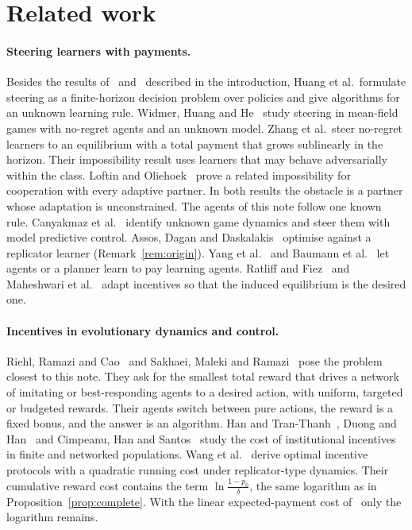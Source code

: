 \documentclass[11pt,a4paper]{article}
\theoremstyle{definition}
\theoremstyle{plain}
\begin{document}
\section{Related work}\label{sec:related}

\paragraph{Steering learners with payments.}
Besides the results of~\cite{huang2025} and~\cite{zhang2024} described in the introduction, Huang et al.\ formulate steering as a finite-horizon decision problem over policies and give algorithms for an unknown learning rule. Widmer, Huang and He~\cite{widmer2025} study steering in mean-field games with no-regret agents and an unknown model. Zhang et al.\ steer no-regret learners to an equilibrium with a total payment that grows sublinearly in the horizon. Their impossibility result uses learners that may behave adversarially within the class. Loftin and Oliehoek~\cite{loftin2022} prove a related impossibility for cooperation with every adaptive partner. In both results the obstacle is a partner whose adaptation is unconstrained. The agents of this note follow one known rule. Canyakmaz et al.~\cite{canyakmaz2025} identify unknown game dynamics and steer them with model predictive control. Assos, Dagan and Daskalakis~\cite{assos2024} optimise against a replicator learner (Remark~\ref{rem:origin}). Yang et al.~\cite{yang2020} and Baumann et al.~\cite{baumann2020} let agents or a planner learn to pay learning agents. Ratliff and Fiez~\cite{ratliff2018} and Maheshwari et al.~\cite{maheshwari2022} adapt incentives so that the induced equilibrium is the desired one.

\paragraph{Incentives in evolutionary dynamics and control.}
Riehl, Ramazi and Cao~\cite{riehl2017} and Sakhaei, Maleki and Ramazi~\cite{sakhaei2022} pose the problem closest to this note. They ask for the smallest total reward that drives a network of imitating or best-responding agents to a desired action, with uniform, targeted or budgeted rewards. Their agents switch between pure actions, the reward is a fixed bonus, and the answer is an algorithm. Han and Tran-Thanh~\cite{han2018}, Duong and Han~\cite{duong2021} and Cimpeanu, Han and Santos~\cite{cimpeanu2019} study the cost of institutional incentives in finite and networked populations. Wang et al.~\cite{wang2023} derive optimal incentive protocols with a quadratic running cost under replicator-type dynamics. Their cumulative reward cost contains the term $\ln\frac{1-p_0}{\delta}$, the same logarithm as in Proposition~\ref{prop:complete}. With the linear expected-payment cost of~\cite{huang2025} only the logarithm remains.
\end{document}
